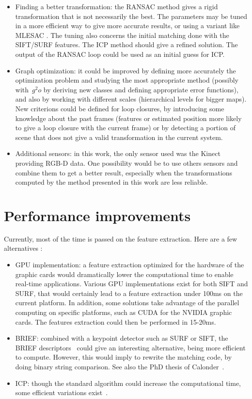 \begin{itemize}
\item Finding a better transformation: the \gls{RANSAC} method gives a rigid transformation that is not necessarily the best. The parameters may be tuned in a more efficient way to give more accurate results, or using a variant like MLESAC \cite{TorrZ00}. The tuning also concerns the initial matching done with the \gls{SIFT}/\gls{SURF} features. The \gls{ICP} \cite{zhang_92_icp} method should give a refined solution. The output of the \gls{RANSAC} loop could be used as an initial guess for \gls{ICP}. 
\item Graph optimization: it could be improved by defining more accurately the optimization problem and studying the most appropriate method (possibly with~$g^2o$ by deriving new classes and defining appropriate error functions), and also by working with different scales (hierarchical levels for bigger maps). New criterions could be defined for loop closures, by introducing some knowledge about the past frames (features or estimated position more likely to give a loop closure with the current frame) or by detecting a portion of scene that does not give a valid transformation in the current system.
\item Additional sensors: in this work, the only sensor used was the Kinect providing RGB-D data. One possibility would be to use others sensors and combine them to get a better result, especially when the transformations computed by the method presented in this work are less reliable.
\end{itemize}

\section{Performance improvements}

Currently, most of the time is passed on the feature extraction. Here are a few alternatives :
\begin{itemize}
\item GPU implementation: a feature extraction optimized for the hardware of the graphic cards would dramatically lower the computational time to enable real-time applications. Various GPU implementations exist for both SIFT and SURF, that would certainly lead to a feature extraction under 100ms on the current platform. In addition, some solutions take advantage of the parallel computing on specific platforms, such as CUDA\texttrademark{} for the NVIDIA graphic cards. The features extraction could then be performed in 15-20ms.
\item BRIEF: combined with a keypoint detector such as \gls{SURF} or \gls{SIFT}, the \gls{BRIEF} descriptors~\cite{Calonder10-brief} could give an interesting alternative, being more efficient to compute. However, this would imply to rewrite the matching code, by doing binary string comparison. See also the PhD thesis of Calonder~\cite{Calonder10_PhD}.
\item ICP: though the standard algorithm could increase the computational time, some efficient variations exist~\cite{Rusinkiewicz_2001}. 
\end{itemize}

